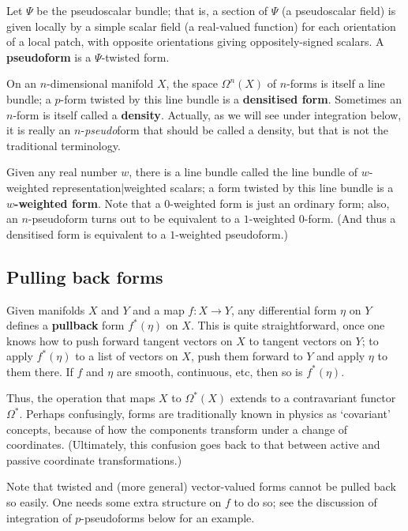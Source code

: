 \documentclass[preprint, 5p, 10pt]{elsarticle}
\theoremstyle{plain}
\begin{document}
Let $\Psi$ be the pseudoscalar bundle; that is, a section of $\Psi$ (a pseudoscalar field) is given locally by a simple scalar field (a real-valued function) for each orientation of a local patch, with opposite orientations giving oppositely-signed scalars. A \textbf{pseudoform} is a $\Psi$-twisted form.

On an $n$-dimensional manifold $X$, the space $\Omega^n(X)$ of $n$-forms is itself a line bundle; a $p$-form twisted by this line bundle is a \textbf{densitised form}. Sometimes an $n$-form is itself called a \textbf{density}. Actually, as we will see under integration below, it is really an $n$-\emph{pseudo}form that should be called a density, but that is not the traditional terminology.

Given any real number $w$, there is a line bundle called the line bundle of $w$-weighted representation|weighted scalars; a form twisted by this line bundle is a \textbf{$w$-weighted form}. Note that a $0$-weighted form is just an ordinary form; also, an $n$-pseudoform turns out to be equivalent to a $1$-weighted $0$-form. (And thus a densitised form is equivalent to a $1$-weighted pseudoform.)

\hypertarget{pulling_back_forms_7}{}\subsection*{{Pulling back forms}}\label{pulling_back_forms_7}

Given manifolds $X$ and $Y$ and a map $f: X \to Y$, any differential form $\eta$ on $Y$ defines a \textbf{pullback} form $f^*(\eta)$ on $X$. This is quite straightforward, once one knows how to push forward tangent vectors on $X$ to tangent vectors on $Y$; to apply $f^*(\eta)$ to a list of vectors on $X$, push them forward to $Y$ and apply $\eta$ to them there. If $f$ and $\eta$ are smooth, continuous, etc, then so is $f^*(\eta)$.

Thus, the operation that maps $X$ to $\Omega^*(X)$ extends to a contravariant functor $\Omega^*$. Perhaps confusingly, forms are traditionally known in physics as `{}covariant'{} concepts, because of how the components transform under a change of coordinates. (Ultimately, this confusion goes back to that between active and passive coordinate transformations.)

Note that twisted and (more general) vector-valued forms cannot be pulled back so easily. One needs some extra structure on $f$ to do so; see the discussion of integration of $p$-pseudoforms below for an example.
\end{document}
